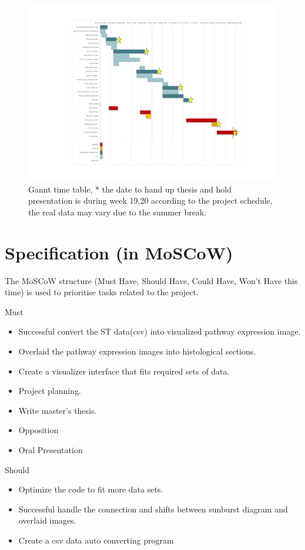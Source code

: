 \documentclass[a4paper]{article}
\begin{document}
\begin{figure}[h]
	\centering
	\includegraphics[width=\textwidth]{Gannt.pdf}
	\caption{Gannt time table, * the date to hand up thesis and hold presentation is during week 19,20 according to the project schedule, the real data may vary due to the summer break. }
\end{figure}


\section{Specification (in MoSCoW)}
The MoSCoW structure (Must Have, Should Have, Could Have, Won't Have this time) is used to prioritise tasks related to the project.

Must 
\begin{itemize}
  \item Successful convert the ST data(csv) into visualized pathway expression image.
  \item Overlaid the pathway expression images into histological sections.
  \item Create a visualizer interface that fits required sets of data.
  \item Project planning. 
  \item Write master’s thesis. 
  \item Opposition
  \item Oral Presentation
\end{itemize}

Should
 
\begin{itemize}
  \item Optimize the code to fit more data sets.
  \item Successful handle the connection and shifts between sunburst diagram and overlaid images.  
  \item Create a csv data auto converting program
\end{itemize}
\end{document}
